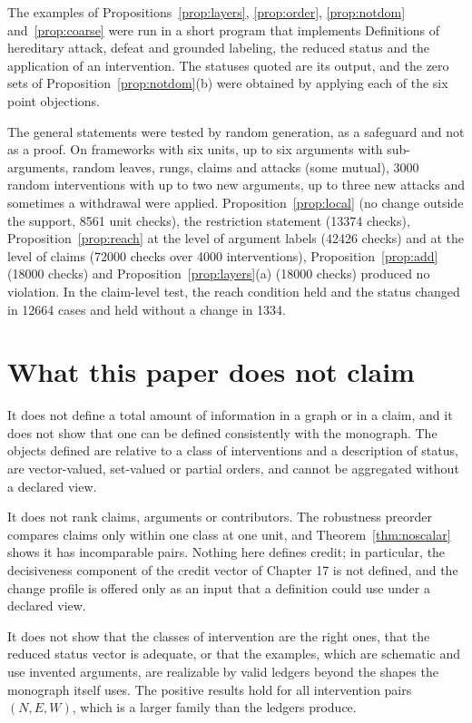 \documentclass[11pt]{article}
\theoremstyle{plain}
\theoremstyle{definition}
\theoremstyle{remark}
\begin{document}
The examples of Propositions~\ref{prop:layers}, \ref{prop:order}, \ref{prop:notdom} and~\ref{prop:coarse} were run in a short program that implements Definitions of hereditary attack, defeat and grounded labeling, the reduced status and the application of an intervention. The statuses quoted are its output, and the zero sets of Proposition~\ref{prop:notdom}(b) were obtained by applying each of the six point objections.

The general statements were tested by random generation, as a safeguard and not as a proof. On frameworks with six units, up to six arguments with sub-arguments, random leaves, rungs, claims and attacks (some mutual), 3000 random interventions with up to two new arguments, up to three new attacks and sometimes a withdrawal were applied. Proposition~\ref{prop:local} (no change outside the support, 8561 unit checks), the restriction statement (13374 checks), Proposition~\ref{prop:reach} at the level of argument labels (42426 checks) and at the level of claims (72000 checks over 4000 interventions), Proposition~\ref{prop:add} (18000 checks) and Proposition~\ref{prop:layers}(a) (18000 checks) produced no violation. In the claim-level test, the reach condition held and the status changed in 12664 cases and held without a change in 1334.

\section{What this paper does not claim}\label{sec:claims}

It does not define a total amount of information in a graph or in a claim, and it does not show that one can be defined consistently with the monograph. The objects defined are relative to a class of interventions and a description of status, are vector-valued, set-valued or partial orders, and cannot be aggregated without a declared view.

It does not rank claims, arguments or contributors. The robustness preorder compares claims only within one class at one unit, and Theorem~\ref{thm:noscalar} shows it has incomparable pairs. Nothing here defines credit; in particular, the decisiveness component of the credit vector of Chapter 17 is not defined, and the change profile is offered only as an input that a definition could use under a declared view.

It does not show that the classes of intervention are the right ones, that the reduced status vector is adequate, or that the examples, which are schematic and use invented arguments, are realizable by valid ledgers beyond the shapes the monograph itself uses. The positive results hold for all intervention pairs $(N,E,W)$, which is a larger family than the ledgers produce.
\end{document}
